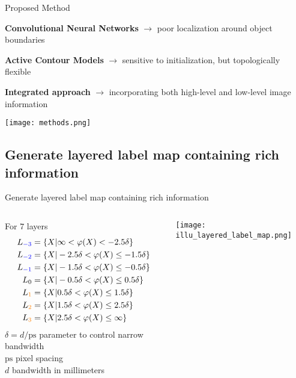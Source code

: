 
\begin{frame}{Proposed Method}
 
    \textbf{Convolutional Neural Networks} $\rightarrow$ poor localization around object boundaries 
    
    \textbf{Active Contour Models} $\rightarrow$ sensitive to initialization, but topologically flexible

    \textbf{Integrated approach} $\rightarrow$ incorporating both high-level and low-level image information

    \vfill
    {\centering\texttt{[image: methods.png]}}

\end{frame}


\subsection{Generate layered label map containing rich information}
\begin{frame}{Generate layered label map containing rich information}
    \begin{columns}
        \begin{column}{.5\textwidth}
            For $7$ layers
            \begin{align*}
                L_{\textcolor{blue}{-3}} &= \lbrace X | \infty < \varphi(X) < -2.5 \delta \rbrace \\
                L_{\textcolor{blue}{-2}} &= \lbrace X | -2.5 \delta < \varphi(X) \leq -1.5 \delta \rbrace \\
                L_{\textcolor{blue}{-1}} &= \lbrace X | -1.5 \delta < \varphi(X) \leq -0.5 \delta \rbrace \\
                L_{0} &= \lbrace X | -0.5 \delta < \varphi(X) \leq 0.5 \delta \rbrace \\
                L_{\textcolor{orange}{1}} &= \lbrace X | 0.5 \delta < \varphi(X) \leq 1.5 \delta \rbrace \\
                L_{\textcolor{orange}{2}} &= \lbrace X | 1.5 \delta < \varphi(X) \leq 2.5 \delta \rbrace \\
                L_{\textcolor{orange}{3}} &= \lbrace X | 2.5 \delta < \varphi(X) \leq \infty \rbrace
            \end{align*}
            $\delta = d/\textrm{ps}$ parameter to control narrow bandwidth\\ 
            $\textrm{ps}$ pixel spacing\\ 
            $d$ bandwidth in millimeters \\ 
        \end{column}

    \begin{column}{.5\textwidth}
    \texttt{[image: illu\_layered\_label\_map.png]}
    \end{column}
    \end{columns}
\end{frame}

